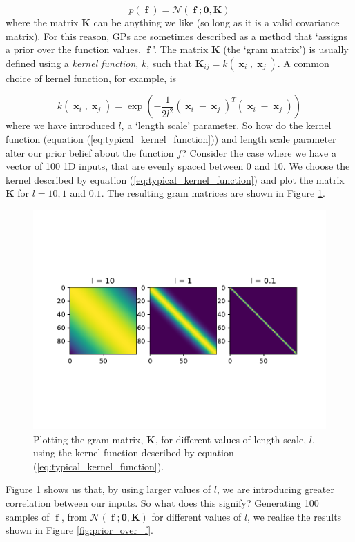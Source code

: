 \documentclass[a4paper, 11pt]{article}
\DeclareMathOperator{\f}{\boldsymbol{f}}
\DeclareMathOperator{\x}{\boldsymbol{x}}
\begin{document}
\begin{equation}
	p(\f) = \mathcal{N}(\f;\boldsymbol{0},\boldsymbol{K})
\end{equation} 
where the matrix $\boldsymbol{K}$ can be anything we like (so long as it is a valid covariance matrix). For this reason, GPs are sometimes described as a method that `assigns a prior over the function values, $\f$'. The matrix $\boldsymbol{K}$ (the `gram matrix') is usually defined using a \emph{kernel function}, $k$, such that $\boldsymbol{K}_{ij} = k(\x_i,\x_j)$. A common choice of kernel function, for example, is 

\begin{equation}
	k(\x_i,\x_j) = \exp \left( -\frac{1}{2 l^2} (\x_i-\x_j)^T(\x_i-\x_j) \right)
	\label{eq:typical_kernel_function}
\end{equation}
where we have introduced $l$, a `length scale' parameter. So how do the kernel function (equation (\ref{eq:typical_kernel_function})) and length scale parameter alter our prior belief about the function $f$? Consider the case where we have a vector of 100 1D inputs, that are evenly spaced between 0 and 10. We choose the kernel described by equation (\ref{eq:typical_kernel_function}) and plot the matrix $\boldsymbol{K}$ for $l=10,1$ and $0.1$. The resulting gram matrices are shown in Figure \ref{fig:K_lengthscales}.\\

\begin{figure}[H]
	\centering
	\includegraphics[scale=0.8,trim={0 2cm 0 2cm},clip]{figures/K_images.pdf}
	\caption{Plotting the gram matrix, $\boldsymbol{K}$, for different values of length scale, $l$, using the kernel function described by equation (\ref{eq:typical_kernel_function}).}
	\label{fig:K_lengthscales}
\end{figure}
Figure \ref{fig:K_lengthscales} shows us that, by using larger values of $l$, we are introducing greater correlation between our inputs. So what does this signify? Generating 100 samples of $\f$, from $\mathcal{N}(\f;\boldsymbol{0},\boldsymbol{K})$ for different values of $l$, we realise the results shown in Figure \ref{fig:prior_over_f}.\\
\end{document}
